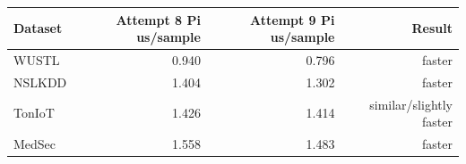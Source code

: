 \begin{tabular}{lrrr}
\toprule
Dataset & Attempt 8 Pi us/sample & Attempt 9 Pi us/sample & Result \\
\midrule
WUSTL & 0.940 & 0.796 & faster \\
NSLKDD & 1.404 & 1.302 & faster \\
TonIoT & 1.426 & 1.414 & similar/slightly faster \\
MedSec & 1.558 & 1.483 & faster \\
\bottomrule
\end{tabular}
